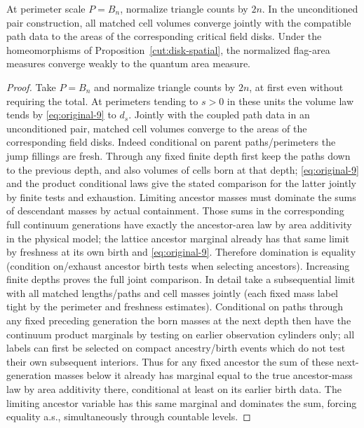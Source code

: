\begin{proposition}\label{cut:joint-volumes}
At perimeter scale \(P=B_n\), normalize triangle counts by \(2n\).
In the unconditioned pair construction, all matched cell volumes converge
jointly with the compatible path data to the areas of the corresponding
critical field disks.  Under the homeomorphisms of
Proposition~\ref{cut:disk-spatial}, the normalized flag-area measures converge
weakly to the quantum area measure.
\end{proposition}
\begin{proof}\leavevmode

Take \(P=B_n\) and normalize triangle counts by \(2n\), at first even without requiring the total.
At perimeters tending to \(s>0\) in these units the volume law tends by \eqref{eq:original-9} to \(d_s\).
Jointly with the coupled path data in an unconditioned pair, matched cell volumes converge to the areas of the corresponding field disks.
Indeed conditional on parent paths/perimeters the jump fillings are fresh.
Through any fixed finite depth first keep the paths down to the previous depth, and also volumes of cells born at that depth; \eqref{eq:original-9} and the product conditional laws give the stated comparison for the latter jointly by finite tests and exhaustion.
Limiting ancestor masses must dominate the sums of descendant masses by actual containment.
Those sums in the corresponding full continuum generations have exactly the ancestor-area law by area additivity in the physical model; the lattice ancestor marginal already has that same limit by freshness at its own birth and \eqref{eq:original-9}.
Therefore domination is equality (condition on/exhaust ancestor birth tests when selecting ancestors).
Increasing finite depths proves the full joint comparison.
In detail take a subsequential limit with all matched lengths/paths and cell masses jointly (each fixed mass label tight by the perimeter and freshness estimates).
Conditional on paths through any fixed preceding generation the born masses at the next depth then have the continuum product marginals by testing on earlier observation cylinders only; all labels can first be selected on compact ancestry/birth events which do not test their own subsequent interiors.
Thus for any fixed ancestor the sum of these next-generation masses below it already has marginal equal to the true ancestor-mass law by area additivity there, conditional at least on its earlier birth data.
The limiting ancestor variable has this same marginal and dominates the sum, forcing equality a.s., simultaneously through countable levels.

\end{proof}
